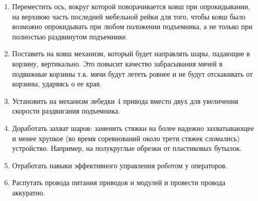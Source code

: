 \begin{enumerate}
\begin{enumerate}
  	\item Переместить ось, вокруг которой поворачивается ковш при опрокидывании, на верхнюю часть последней мебельной рейки для того, чтобы ковш было возможно опрокидывать при любом положении подъемника, а не только при полностью раздвинутом подъемнике.
  	
  	\item Поставить на ковш механизм, который будет направлять шары, падающие в корзину, вертикально. Это повысит качество забрасывания мячей в подвижные корзины т.к. мячи будут лететь ровнее и не будут отскакивать от корзины, ударяясь о ее края.
  	
  	\item Установить на механизм лебедки 4 привода вместо двух для увеличения скорости раздвигания подъемника.
  	
  	\item Доработать захват шаров: заменить стяжки на более надежно захватывающее и менее хрупкое (во время соревнований около трети стяжек сломались) устройство. Например, на полукруглые обрезки от пластиковых бутылок.
  	
  	\item Отработать навыки эффективного управления роботом у операторов.
  	
  	\item Распутать провода питания приводов и модулей и провести провода аккуратно.
  	
  \end{enumerate}
  
\end{enumerate}
\fillpage